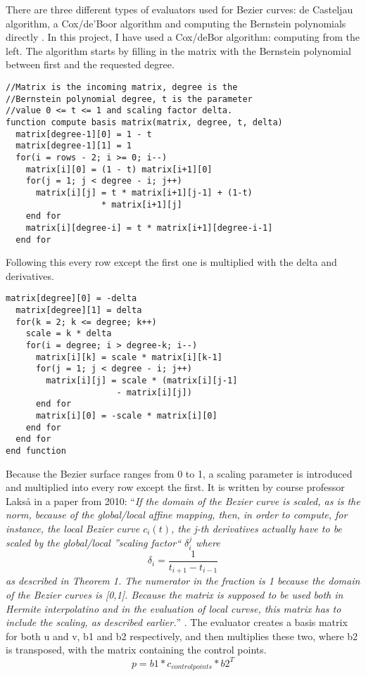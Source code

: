 \documentclass[a4paper,11pt]{article}
\begin{document}
There are three different types of evaluators used for Bezier curves: de Casteljau algorithm, a Cox/de'Boor algorithm and computing the Bernstein polynomials directly \cite{book_bperbs}. In this project, I have used a Cox/deBor algorithm: computing from the left. The algorithm starts by filling in the matrix with the Bernstein polynomial between first and the requested degree.
\label{fig:bezierEval1}
\begin{lstlisting}[frame=single, caption={Assigning the top half of the matrix.}] 
//Matrix is the incoming matrix, degree is the 
//Bernstein polynomial degree, t is the parameter
//value 0 <= t <= 1 and scaling factor delta.
function compute basis matrix(matrix, degree, t, delta)
  matrix[degree-1][0] = 1 - t
  matrix[degree-1][1] = 1
  for(i = rows - 2; i >= 0; i--)
    matrix[i][0] = (1 - t) matrix[i+1][0]
    for(j = 1; j < degree - i; j++)
      matrix[i][j] = t * matrix[i+1][j-1] + (1-t)
                   * matrix[i+1][j]
    end for
    matrix[i][degree-i] = t * matrix[i+1][degree-i-1]
  end for
\end{lstlisting}
Following this every row except the first one is multiplied with the delta and derivatives.  
\label{fig:bezierEval2}
\begin{lstlisting}[frame=single, caption={Assigning the bottom half of the matrix}] 
  matrix[degree][0] = -delta
  matrix[degree][1] = delta
  for(k = 2; k <= degree; k++)
    scale = k * delta
    for(i = degree; i > degree-k; i--)
      matrix[i][k] = scale * matrix[i][k-1]
      for(j = 1; j < degree - i; j++)
        matrix[i][j] = scale * (matrix[i][j-1]
                      - matrix[i][j])
      end for
      matrix[i][0] = -scale * matrix[i][0]
    end for
  end for
end function
\end{lstlisting}
Because the Bezier surface ranges from 0 to 1, a scaling parameter is introduced and multiplied into every row except the first. It is written by course professor Lakså in a paper from 2010: ``\textit{If the domain of the Bezier curve is scaled, as is the norm, because of the global/local affine mapping, then, in order to compute, for instance, the local Bezier curve $c_{i}(t)$, the j-th derivatives actually have to be scaled by the global/local ''scaling factor`` $\delta_{i}^{j}$ where
\begin{equation}
 \delta_{i} = \frac{1}{t_{i+1}-t_{i-1}}
\end{equation}
as described in Theorem 1. The numerator in the fraction is 1 because the domain of the Bezier curves is [0,1]. Because the matrix is supposed to be used both in Hermite interpolatino and in the evaluation of local curvse, this matrix has to include the scaling, as described earlier.}'' \cite{art_gmbf}.
The evaluator creates a basis matrix for both u and v, b1 and b2 respectively, and then multiplies these two, where b2 is transposed, with the matrix containing the control points.
\begin{equation}
 p = b1 * c_{control points} * b2^{T}
\end{equation}
\end{document}

